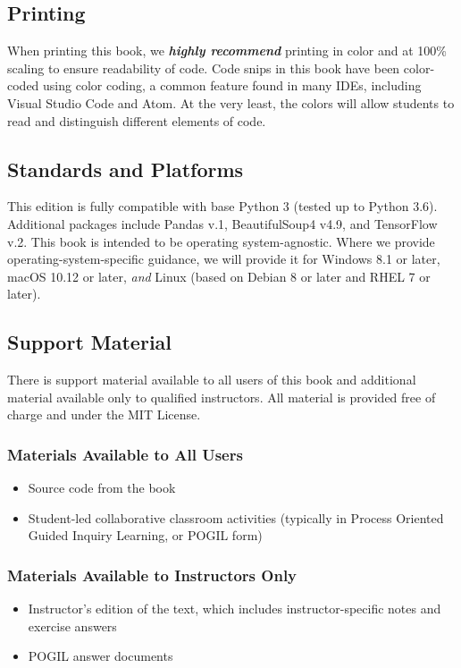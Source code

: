 \subsection*{Printing}
When printing this book, we \textbf{\textit{highly recommend}} printing in color and at 100\% scaling to ensure readability of code. Code snips in this book have been color-coded using color coding, a common feature found in many IDEs, including Visual Studio Code and Atom. At the very least, the colors will allow students to read and distinguish different elements of code.\par
\subsection*{Standards and Platforms}
This edition is fully compatible with base Python 3 (tested up to Python 3.6). Additional packages include Pandas v.1, BeautifulSoup4 v4.9, and TensorFlow v.2. This book is intended to be operating system-agnostic. Where we provide operating-system-specific guidance, we will provide it for Windows 8.1 or later, macOS 10.12 or later, \textit{and} Linux (based on Debian 8 or later and RHEL 7 or later).
\subsection*{Support Material}
There is support material available to all users of this book and additional material available only to qualified instructors. All material is provided free of charge and under the MIT License.
\subsubsection*{Materials Available to All Users}
\begin{itemize}
    \item {Source code from the book}
    \item {Student-led collaborative classroom activities (typically in Process Oriented Guided Inquiry Learning, or POGIL form)}
\end{itemize}
\subsubsection*{Materials Available to Instructors Only}
\begin{itemize}
    \item {Instructor's edition of the text, which includes instructor-specific notes and exercise answers}
    \item {POGIL answer documents}
\end{itemize}
